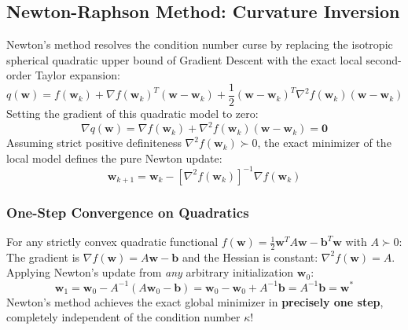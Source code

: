 \subsection{Newton-Raphson Method: Curvature Inversion}
Newton's method resolves the condition number curse by replacing the isotropic spherical quadratic upper bound of Gradient Descent with the exact local second-order Taylor expansion:
\begin{equation}
q(\mathbf{w}) = f(\mathbf{w}_k) + \nabla f(\mathbf{w}_k)^T (\mathbf{w} - \mathbf{w}_k) + \frac{1}{2}(\mathbf{w} - \mathbf{w}_k)^T \nabla^2 f(\mathbf{w}_k) (\mathbf{w} - \mathbf{w}_k)
\end{equation}
Setting the gradient of this quadratic model to zero:
\begin{equation}
\nabla q(\mathbf{w}) = \nabla f(\mathbf{w}_k) + \nabla^2 f(\mathbf{w}_k)(\mathbf{w} - \mathbf{w}_k) = \mathbf{0}
\end{equation}
Assuming strict positive definiteness $\nabla^2 f(\mathbf{w}_k) \succ 0$, the exact minimizer of the local model defines the pure Newton update:
\begin{equation}
\mathbf{w}_{k+1} = \mathbf{w}_k - [\nabla^2 f(\mathbf{w}_k)]^{-1} \nabla f(\mathbf{w}_k)
\label{eq:newton_update}
\end{equation}

\subsubsection{One-Step Convergence on Quadratics}
For any strictly convex quadratic functional $f(\mathbf{w}) = \frac{1}{2}\mathbf{w}^T A \mathbf{w} - \mathbf{b}^T \mathbf{w}$ with $A \succ 0$:
The gradient is $\nabla f(\mathbf{w}) = A\mathbf{w} - \mathbf{b}$ and the Hessian is constant: $\nabla^2 f(\mathbf{w}) = A$.
Applying Newton's update from \emph{any} arbitrary initialization $\mathbf{w}_0$:
\begin{equation}
\mathbf{w}_1 = \mathbf{w}_0 - A^{-1}(A\mathbf{w}_0 - \mathbf{b}) = \mathbf{w}_0 - \mathbf{w}_0 + A^{-1}\mathbf{b} = A^{-1}\mathbf{b} = \mathbf{w}^*
\end{equation}
Newton's method achieves the exact global minimizer in \textbf{precisely one step}, completely independent of the condition number $\kappa$!

